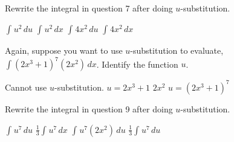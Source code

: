 \documentclass[addpoints, 12pt]{exam}%
\newcommand{\spc}{\vspace*{0.5cm}}
\begin{document}
\begin{questions}
\spc

\question[1]

Rewrite the integral in question 7 after doing $u$-substitution.

\begin{multicols}{2}
\begin{choices}
\CorrectChoice $\int_{}^{} u^2\,du$
\choice $\int_{}^{} u^2\,dx$
\choice $\int_{}^{} 4x^2\,du$
\choice $\int_{}^{} 4x^2\,dx$
\end{choices}
\end{multicols}

\spc

\question[1]

Again, suppose you want to use $u$-substitution to evaluate, $\displaystyle \int (2x^3 + 1)^7(2x^2)\,dx$. Identify the function $u$.

\begin{multicols}{2}
\begin{choices}
\choice Cannot use $u$-substitution.
\CorrectChoice $u = 2x^3 + 1$
\choice $2x^2$
\choice $u = (2x^3 + 1)^7$
\end{choices}
\end{multicols}

\spc

\question[1]

Rewrite the integral in question 9 after doing $u$-substitution.

\begin{multicols}{2}
\begin{choices}
\choice $\int_{}^{} u^7\,du$
\choice $\frac{1}{3}\int_{}^{} u^7\,dx$
\choice $\int_{}^{} u^7(2x^2)\,du$
\CorrectChoice $\frac{1}{3}\int_{}^{} u^7\,du$
\end{choices}
\end{multicols}

\end{questions}
\end{document}
